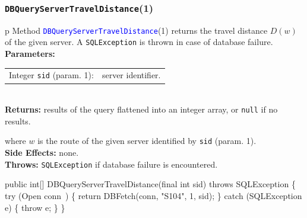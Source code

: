 \documentclass{article}
\def\nwendcode{\endtrivlist \endgroup}      %
\let\nwdocspar=\par
\theoremstyle{definition}                   %
\begin{document}
\subsubsection{{\tt{}\protect{}DBQueryServerTravelDistance}(1)}
\begin{tabular}{p{\textwidth}}
\toprule
{}
Method \textcolor{blue}{{\tt{}\protect{}DBQueryServerTravelDistance}}(1) returns the
travel distance $D(w)$ of the given server.
A {\tt{}SQLException} is thrown in case of database failure.\\
\midrule
\textbf{Parameters:} \\
\begin{tabular}{lp{116mm}}
Integer {\tt{}sid} (param. 1):&server identifier.
\end{tabular}\\
\textbf{Returns:} results of the query flattened into an integer array,
or {\tt{}null} if no results.


where $w$ is the route of the given server identified by {\tt{}sid} (param. 1).\\
\textbf{Side Effects:} none.\\
\textbf{Throws:} {\tt{}SQLException} if database failure is encountered.\\
\bottomrule
\end{tabular}
\nwenddocs{}\plusendmoddef
public int[] DBQueryServerTravelDistance(final int sid) throws SQLException \{
  try (\LA{}Open \code{}conn\edoc{}~{\nwtagstyle{}}\RA{}) \{
    return DBFetch(conn, "S104", 1, sid);
  \} catch (SQLException e) \{
    throw e;
  \}
\}
\eatline
{}\nwendcode{}\nwdocspar
\end{document}
